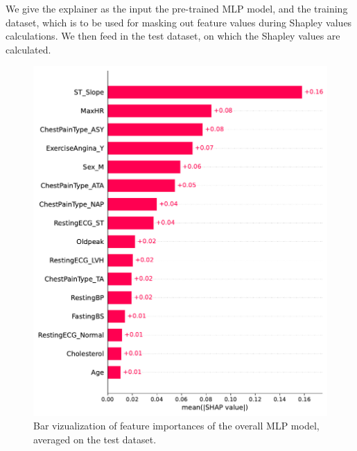We give the explainer as the input the pre-trained MLP model, and the training dataset, which is to be used for masking out feature values during Shapley values calculations. We then feed in the test dataset, on which the Shapley values are calculated.

\begin{figure}
    \centering
    \includegraphics[width=0.8\columnwidth]{images/shap_bar.pdf}
    \caption{Bar vizualization of feature importances of the overall MLP model, averaged on the test dataset.}
    \label{fig:shap_bar}
\end{figure}
